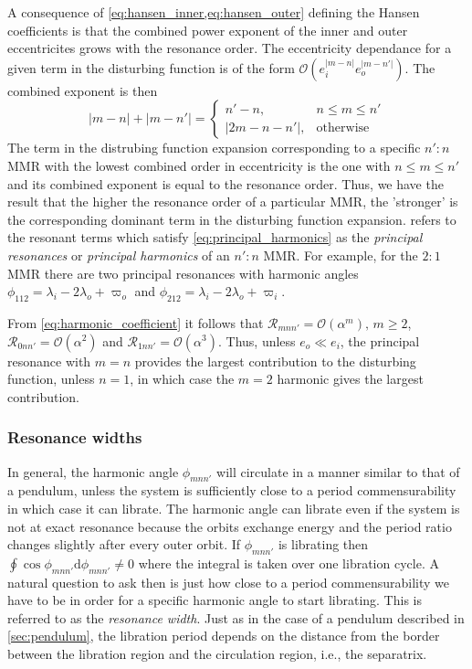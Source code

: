 \documentclass[ twoside,openright,titlepage,numbers=noenddot,headinclude,%
                footinclude=true,cleardoublepage=empty,abstractoff, %
                BCOR=5mm,paper=a4,fontsize=11pt,%
                american,%
                ]{scrreprt}
\begin{document}
A consequence of \cref{eq:hansen_inner,eq:hansen_outer}
defining the Hansen coefficients
is that the combined power exponent of the inner and outer 
eccentricites 
grows with the resonance order. The eccentricity dependance
for a given term in the disturbing function 
is of the form $\mathcal{O}(e_i^{\lvert m-n\rvert}
e_o^{\lvert m-n'\rvert})$. The combined exponent is then
\begin{equation}
    \lvert m-n\rvert+\lvert m-n'\rvert=
    \begin{cases}
        n'-n, & n\leq m\leq n'\\
        \lvert 2m-n-n'\rvert, & \text{otherwise}
    \end{cases}
    \label{eq:principal_harmonics}
\end{equation}
The term in the distrubing function expansion corresponding
to a specific $n':n$ MMR with the lowest combined order
in eccentricity is the one with $n\leq m\leq n'$ and its
combined exponent is equal to the resonance order. Thus, we
have the result that the higher the resonance order of
a particular MMR, the 'stronger' is the corresponding dominant
term in the disturbing function expansion. \Cite{Mardling2013}
refers to the resonant terms which satisfy \cref{eq:principal_harmonics}
as the
\emph{principal resonances} or \emph{principal harmonics} 
of an $n':n$ MMR. For example, for the $2:1$ MMR there are two
principal resonances with harmonic angles $\phi_{112}=
\lambda_i-2\lambda_o+\varpi_o$ and $\phi_{212}=\lambda_i
-2\lambda_o+\varpi_i$.

From \cref{eq:harmonic_coefficient} it follows that $\mathcal{R}
_{mnn'}=\mathcal{O}(\alpha^m),\,m\geq 2$, $\mathcal{R}_{0nn'}=
\mathcal{O}(\alpha^2)$ and $\mathcal{R}_{1nn'}=\mathcal{O}(
\alpha^3)$. Thus, unless $e_o\ll e_i$, the principal resonance
with $m=n$ provides the largest contribution to the disturbing
function, unless $n=1$, in which case the $m=2$ harmonic 
gives the largest contribution.
\subsubsection{Resonance widths}
\label{ssub:Resonance_widths}
In general, the harmonic angle $\phi_{mnn'}$ will circulate in a
manner similar to that of a pendulum, unless the system is 
sufficiently close to a period commensurability in which case
it can librate. The harmonic angle
can librate even if the system is not at exact resonance
because the orbits exchange energy and the period ratio changes
slightly after every outer orbit. If $\phi_{mnn'}$ is librating
 then $\oint\cos\phi_{mnn'}\mathrm{d}\phi_{mnn'}\neq 0$ where the
integral is taken over one libration cycle. A natural 
question to ask then is just how close to a period commensurability
we have to be in order for a specific harmonic angle to start
librating. This is referred to as the \emph{resonance width}.
Just as in the case of a pendulum described in 
\cref{sec:pendulum}, the libration period 
depends on the distance from the border between the libration region
and the circulation region, i.e., the separatrix.  
\end{document}
